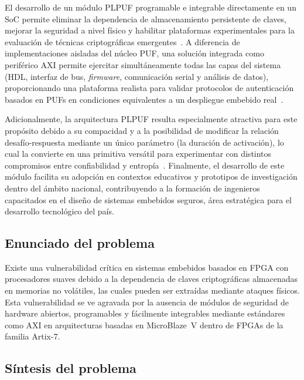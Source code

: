 El desarrollo de un módulo PLPUF programable e integrable directamente en un
SoC permite eliminar la dependencia de almacenamiento persistente de
claves, mejorar la seguridad a nivel físico y habilitar plataformas
experimentales para la evaluación de técnicas criptográficas
emergentes~\cite{delvaux_2015_helper, farha_2019_physical}. A diferencia de
implementaciones aisladas del núcleo PUF, una solución integrada como
periférico AXI permite ejercitar simultáneamente todas las capas del sistema
(HDL, interfaz de bus, \textit{firmware}, comunicación serial y análisis de
datos), proporcionando una plataforma realista para validar protocolos de
autenticación basados en PUFs en condiciones equivalentes a un despliegue
embebido real~\cite{idriss_2021_lightweight, hou_2023_modeling}.

Adicionalmente, la arquitectura PLPUF resulta especialmente atractiva para
este propósito debido a su compacidad y a la posibilidad de modificar la
relación desafío-respuesta mediante un único parámetro (la duración de
activación), lo cual la convierte en una primitiva versátil para experimentar
con distintos compromisos entre confiabilidad y
entropía~\cite{hori_2011_pseudolfsr, alsharkawy_2024_plpufs}. Finalmente, el
desarrollo de este módulo facilita su adopción en contextos educativos y
prototipos de investigación dentro del ámbito nacional, contribuyendo a la
formación de ingenieros capacitados en el diseño de sistemas embebidos
seguros, área estratégica para el desarrollo tecnológico del país.

\subsection{Enunciado del problema}

Existe una vulnerabilidad crítica en sistemas embebidos basados en FPGA con procesadores
suaves debido a la dependencia de claves criptográficas almacenadas en memorias no
volátiles, las cuales pueden ser extraídas mediante ataques físicos. Esta vulnerabilidad
se ve agravada por la ausencia de módulos de seguridad de hardware abiertos,
programables y fácilmente integrables mediante estándares como AXI en arquitecturas
basadas en MicroBlaze~V dentro de FPGAs de la familia Artix-7.

\subsection{Síntesis del problema}

